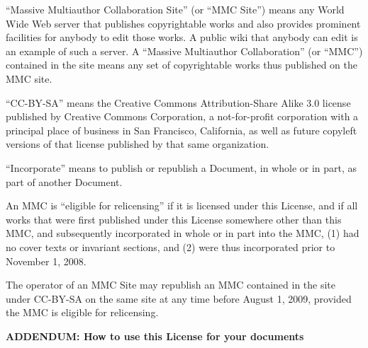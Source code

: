 \ifdefined\eng
\fi

\ifdefined\chs

\fi

\ifdefined\eng
``Massive Multiauthor Collaboration Site'' (or ``MMC Site'') means any
World Wide Web server that publishes copyrightable works and also
provides prominent facilities for anybody to edit those works.  A
public wiki that anybody can edit is an example of such a server.  A
``Massive Multiauthor Collaboration'' (or ``MMC'') contained in the
site means any set of copyrightable works thus published on the MMC
site.
\fi

\ifdefined\chs

\fi

\ifdefined\eng
``CC-BY-SA'' means the Creative Commons Attribution-Share Alike 3.0
license published by Creative Commons Corporation, a not-for-profit
corporation with a principal place of business in San Francisco,
California, as well as future copyleft versions of that license
published by that same organization.
\fi

\ifdefined\chs

\fi

\ifdefined\eng
``Incorporate'' means to publish or republish a Document, in whole or
in part, as part of another Document.
\fi

\ifdefined\chs

\fi

\ifdefined\eng
An MMC is ``eligible for relicensing'' if it is licensed under this
License, and if all works that were first published under this License
somewhere other than this MMC, and subsequently incorporated in whole
or in part into the MMC, (1) had no cover texts or invariant sections,
and (2) were thus incorporated prior to November 1, 2008.
\fi

\ifdefined\chs

\fi

\ifdefined\eng
The operator of an MMC Site may republish an MMC contained in the site
under CC-BY-SA on the same site at any time before August 1, 2009,
provided the MMC is eligible for relicensing.
\fi

\ifdefined\chs

\fi

\ifdefined\eng
\fi

\ifdefined\chs

\fi

\ifdefined\eng
\begin{center}
{\Large\bf ADDENDUM: How to use this License for your documents\par}
\end{center}
\fi

